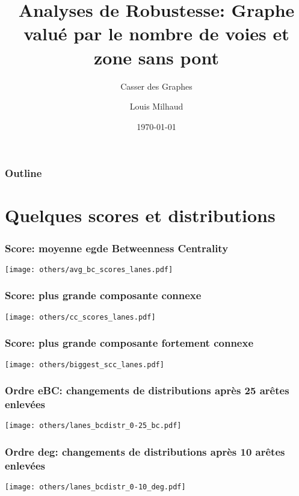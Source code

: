 \documentclass[aspectratio=169]{beamer}
\title{Analyses de Robustesse: Graphe valué par le nombre de voies et zone sans pont}
\subtitle{Casser des Graphes}
\author{Louis Milhaud}
\institute{Complex Networks - LIP6}
\date{\today}
\begin{document}
    \begin{frame}
        \titlepage
    \end{frame}

    \begin{frame}
        \frametitle{Outline}
        \tableofcontents
    \end{frame}

    \section{Quelques scores et distributions}

    \begin{frame}
        \frametitle{Score: moyenne egde Betweenness Centrality}
        \centering
        \texttt{[image: others/avg\_bc\_scores\_lanes.pdf]}
    \end{frame}

    \begin{frame}
        \frametitle{Score: plus grande composante connexe}
        \centering
        \texttt{[image: others/cc\_scores\_lanes.pdf]}
    \end{frame}

    \begin{frame}
        \frametitle{Score: plus grande composante fortement connexe}
        \centering
        \texttt{[image: others/biggest\_scc\_lanes.pdf]}
    \end{frame}

    \begin{frame}
        \frametitle{Ordre eBC: changements de distributions après 25 arêtes enlevées}
        \centering
        \texttt{[image: others/lanes\_bcdistr\_0-25\_bc.pdf]}    
    \end{frame}

    \begin{frame}
        \frametitle{Ordre deg: changements de distributions après 10 arêtes enlevées}
        \centering
        \texttt{[image: others/lanes\_bcdistr\_0-10\_deg.pdf]}    
    \end{frame}
\end{document}
